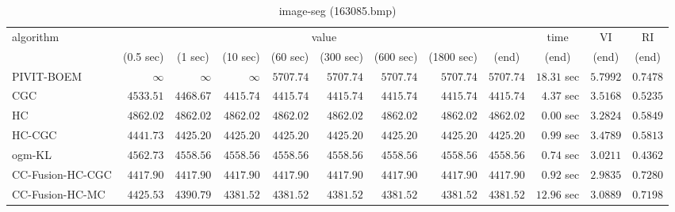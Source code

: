 \begin{table}[H]
\scriptsize
\centering
\caption{image-seg (163085.bmp)}
\label{tab:anytimetable-image-seg-163085.bmp}
\begin{tabular}{lrrrrrrrrrrr}
\toprule
           algorithm &                                   \multicolumn{8}{c}{value} & \multicolumn{1}{c}{time}    & \multicolumn{1}{c}{VI}  & \multicolumn{1}{c}{RI} \\  
\cmidrule(lr){2-9}\cmidrule(lr){10-10} \cmidrule(lr){11-11} \cmidrule(lr){12-12}   
                     & \multicolumn{1}{c}{(0.5 sec)} & \multicolumn{1}{c}{(1 sec)} & \multicolumn{1}{c}{(10 sec)} & \multicolumn{1}{c}{(60 sec)} & \multicolumn{1}{c}{(300 sec)} & \multicolumn{1}{c}{(600 sec)} & \multicolumn{1}{c}{(1800 sec)} & \multicolumn{1}{c}{(end)} & \multicolumn{1}{c}{(end)}    & \multicolumn{1}{c}{(end)}   & \multicolumn{1}{c}{(end)}  \\ \midrule 
          PIVIT-BOEM & $\infty$ & $\infty$ & $\infty$ & $      5707.74$ & $      5707.74$ & $      5707.74$ & $      5707.74$ & $      5707.74$ & $        18.31$ sec    & $       5.7992$  & $       0.7478$ \\ 
                 CGC & $      4533.51$ & $      4468.67$ & $      4415.74$ & $      4415.74$ & $      4415.74$ & $      4415.74$ & $      4415.74$ & $      4415.74$ & $         4.37$ sec    & $       3.5168$  & $       0.5235$ \\ 
                  HC & $      4862.02$ & $      4862.02$ & $      4862.02$ & $      4862.02$ & $      4862.02$ & $      4862.02$ & $      4862.02$ & $      4862.02$ & $         0.00$ sec    & $       3.2824$  & $       0.5849$ \\ 
              HC-CGC & $      4441.73$ & $      4425.20$ & $      4425.20$ & $      4425.20$ & $      4425.20$ & $      4425.20$ & $      4425.20$ & $      4425.20$ & $         0.99$ sec    & $       3.4789$  & $       0.5813$ \\ 
              ogm-KL & $      4562.73$ & $      4558.56$ & $      4558.56$ & $      4558.56$ & $      4558.56$ & $      4558.56$ & $      4558.56$ & $      4558.56$ & $         0.74$ sec    & $       3.0211$  & $       0.4362$ \\ 
    CC-Fusion-HC-CGC & $      4417.90$ & $      4417.90$ & $      4417.90$ & $      4417.90$ & $      4417.90$ & $      4417.90$ & $      4417.90$ & $      4417.90$ & $         0.92$ sec    & $       2.9835$  & $       0.7280$ \\ 
     CC-Fusion-HC-MC & $      4425.53$ & $      4390.79$ & $      4381.52$ & $      4381.52$ & $      4381.52$ & $      4381.52$ & $      4381.52$ & $      4381.52$ & $        12.96$ sec    & $       3.0889$  & $       0.7198$ \\ 

\end{tabular}
\end{table}
